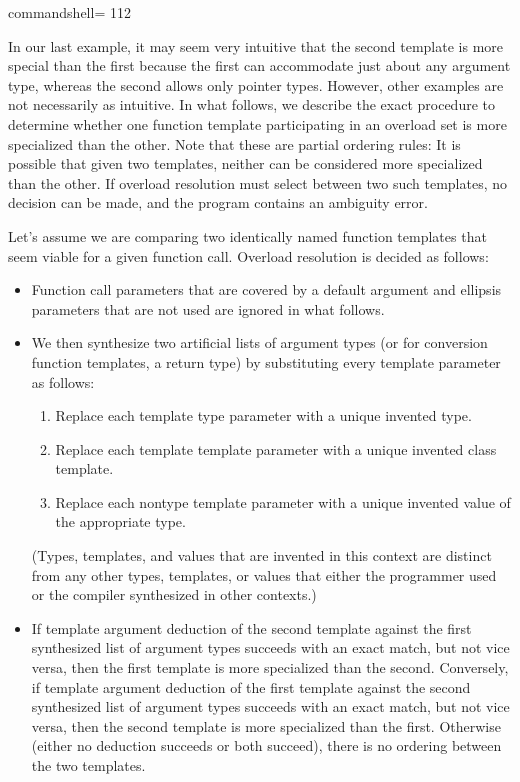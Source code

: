 \begin{tcblisting}{commandshell={}}
112
\end{tcblisting}


In our last example, it may seem very intuitive that the second template is more special than the first because the first can accommodate just about any argument type, whereas the second allows only pointer types. However, other examples are not necessarily as intuitive. In what follows, we describe the exact procedure to determine whether one function template participating in an overload set is more specialized than the other. Note that these are partial ordering rules: It is possible that given two templates, neither can be considered more specialized than the other. If overload resolution must select between two such templates, no decision can be made, and the program contains an ambiguity error.

Let’s assume we are comparing two identically named function templates that seem viable for a given function call. Overload resolution is decided as follows:


\begin{itemize}
\item 
Function call parameters that are covered by a default argument and ellipsis parameters that are not used are ignored in what follows.

\item 
We then synthesize two artificial lists of argument types (or for conversion function templates, a return type) by substituting every template parameter as follows:

\begin{enumerate}
\item 
Replace each template type parameter with a unique invented type.

\item 
Replace each template template parameter with a unique invented class template.

\item 
Replace each nontype template parameter with a unique invented value of the appropriate type.
\end{enumerate}

(Types, templates, and values that are invented in this context are distinct from any other types, templates, or values that either the programmer used or the compiler synthesized in other contexts.)

\item 
If template argument deduction of the second template against the first synthesized list of argument types succeeds with an exact match, but not vice versa, then the first template is more specialized than the second. Conversely, if template argument deduction of the first template against the second synthesized list of argument types succeeds with an exact match, but not vice versa, then the second template is more specialized than the first. Otherwise (either no deduction succeeds or both succeed), there is no ordering between the two templates.
\end{itemize}

